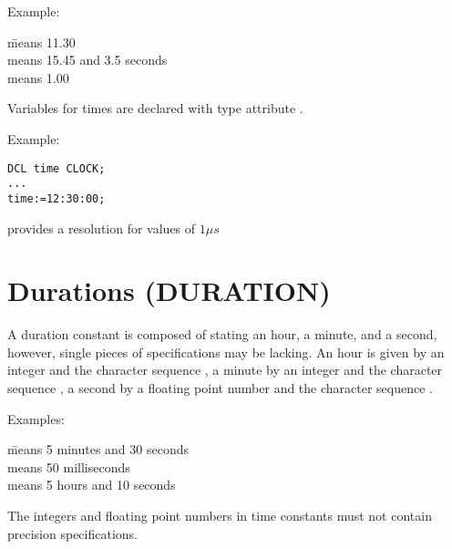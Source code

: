 Example:

\begin{tabbing}
 \x \= means 11.30\\
   \> means 15.45 and 3.5 seconds\\
    \> means 1.00
\end{tabbing}

Variables for times are declared with type attribute .

\begin{grammarframe}

\end{grammarframe}

Example:

\begin{lstlisting}
DCL time CLOCK;
...
time:=12:30:00;
\end{lstlisting}

\OpenPEARL{} provides a resolution for  values of $1\mu s$

\section{Durations (DURATION)}   %
\label{sec_type_duration}

A duration constant is composed of stating an hour, a minute, and a
second, however, single pieces of specifications may be lacking. An hour
is given by an integer and the character sequence , a minute by an
integer and the character sequence , a second by a floating point
number and the character sequence .

Examples:

\begin{tabbing}
    \= means 5 minutes and 30 seconds \\
             \> means 50 milliseconds \\
    \> means 5 hours and 10 seconds
\end{tabbing}

The integers and floating point numbers in time constants must not
contain precision specifications.

